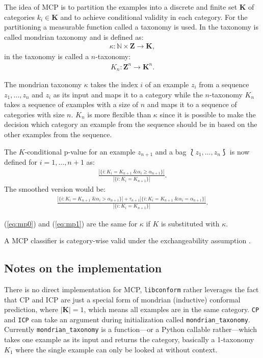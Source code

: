 \documentclass[twoside,11pt]{article}
\def\libconform{\texttt{libconform}}
\begin{document}
The idea of MCP is to partition the examples into a
discrete and finite set $\textbf{K}$ of categories
$k_i \in \textbf{K}$ and to achieve conditional validity in
each category.
For the partitioning a measurable function called a
taxonomy is used.
In \citet[Chapter 4.5]{alrw} the taxonomy is called
mondrian taxonomy and is defined as:
\begin{align*}
  \kappa: \mathbb{N} \times \textbf{Z} \rightarrow
  \textbf{K},
\end{align*}
in \citet[Chapter 2]{cprml} the taxonomy is called a
$n$-taxonomy:
\begin{align*}
  K_n: \textbf{Z}^n \rightarrow \textbf{K}^n.
\end{align*}

The mondrian taxonomy $\kappa$ takes the index $i$ of an
example $z_i$ from a sequence $z_1,\dots,z_n$ and $z_i$ as
its input and maps it to a category while the $n$-taxonomy
$K_n$ takes a sequence of examples with a size of $n$ and
maps it to a sequence of categories with size $n$.
$K_n$ is more flexible than $\kappa$ since it is possible
to make the decision which category an example from the
sequence should be in based on the other examples from the
sequence.

The $K$-conditional p-value for an example $z_{n+1}$ and
a bag $\Lbag z_1,\dots,z_n \Rbag$ is now defined for
$i=1,\dots,n+1$ as:
\begin{align}
  \label{eq:mp0}
  \frac{|\{i:K_i = K_{n+1} \text{ \& } \alpha_i
        \geq \alpha_{n+1}\}|}
  {|\{i: K_i = K_{n+1}\}|}.
\end{align}
The smoothed version would be:
\begin{align}
  \label{eq:mp1}
  \frac{|\{i:K_i = K_{n+1} \text{ \& } \alpha_i >
        \alpha_{n+1}\}| + \tau_{n+1}
        |\{i:K_i = K_{n+1} \text{ \& } \alpha_i =
        \alpha_{n+1}\}|}
  {|\{i: K_i = K_{n+1}\}|}.
\end{align}

(\ref{eq:mp0}) and (\ref{eq:mp1}) are the same for $\kappa$
if $K$ is substituted with $\kappa$.

A MCP classifier is category-wise valid under the
exchangeability assumption \citep[see][]{alrw, cprml}.

\subsection*{Notes on the implementation}

There is no direct implementation for MCP, \libconform{}
rather leverages the fact that CP and ICP are just a
special form of mondrian (inductive) conformal prediction,
where $|\textbf{K}| = 1$, which means all examples are in
the same category.
\texttt{CP} and \texttt{ICP} can take an argument during
initialization called \texttt{mondrian\_taxonomy}.
Currently \texttt{mondrian\_taxonomy} is a function---or
a Python callable rather---which takes one example as its
input and returns the category, basically a 1-taxonomy
$K_1$ where the single example can only be looked at
without context.
\end{document}
